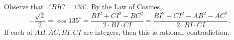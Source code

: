 Observe that $\angle{BIC}=135^\circ$. By the Law of Cosines, \[-\frac{\sqrt{2}}{2}=\cos135^\circ=\frac{BI^2+CI^2-BC^2}{2\cdot BI\cdot CI}=\frac{BI^2+CI^2-AB^2-AC^2}{2\cdot BI\cdot CI}.\] If each of $AB,AC,BI,CI$ are integers, then this is rational, contradiction.